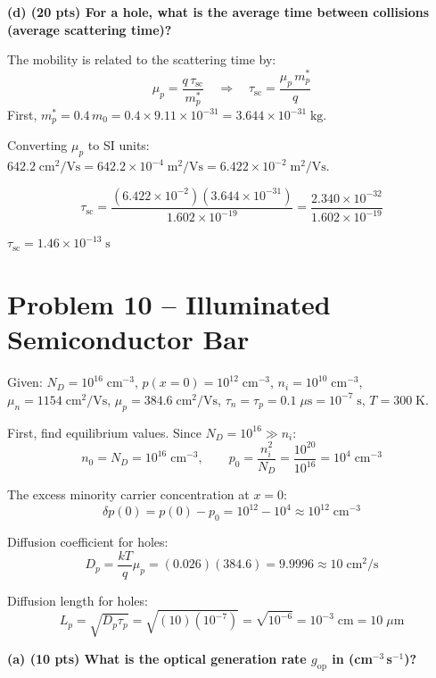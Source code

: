 \documentclass[11pt]{article}
\begin{document}
\textbf{(d) (20 pts) For a hole, what is the average time between collisions (average scattering time)?}

The mobility is related to the scattering time by:
\[
  \mu_p = \frac{q\,\tau_{\text{sc}}}{m_p^*} \quad \Longrightarrow \quad
  \tau_{\text{sc}} = \frac{\mu_p \, m_p^*}{q}
\]
First, $m_p^* = 0.4\,m_0 = 0.4 \times 9.11 \times 10^{-31} = 3.644 \times 10^{-31}\;\text{kg}$.

Converting $\mu_p$ to SI units: $642.2\;\text{cm}^2/\text{Vs} = 642.2 \times 10^{-4}\;\text{m}^2/\text{Vs} = 6.422 \times 10^{-2}\;\text{m}^2/\text{Vs}$.

\[
  \tau_{\text{sc}} = \frac{(6.422 \times 10^{-2})(3.644 \times 10^{-31})}{1.602 \times 10^{-19}}
  = \frac{2.340 \times 10^{-32}}{1.602 \times 10^{-19}}
\]

\begin{answerbox}
  $\tau_{\text{sc}} = 1.46 \times 10^{-13}\;\text{s}$
\end{answerbox}

\newpage

\section*{Problem 10 -- Illuminated Semiconductor Bar}

Given: $N_D = 10^{16}\;\text{cm}^{-3}$, $p(x=0) = 10^{12}\;\text{cm}^{-3}$, $n_i = 10^{10}\;\text{cm}^{-3}$, $\mu_n = 1154\;\text{cm}^2/\text{Vs}$, $\mu_p = 384.6\;\text{cm}^2/\text{Vs}$, $\tau_n = \tau_p = 0.1\;\mu\text{s} = 10^{-7}\;\text{s}$, $T = 300\;\text{K}$.

First, find equilibrium values. Since $N_D = 10^{16} \gg n_i$:
\[
  n_0 = N_D = 10^{16}\;\text{cm}^{-3}, \qquad p_0 = \frac{n_i^2}{N_D} = \frac{10^{20}}{10^{16}} = 10^4\;\text{cm}^{-3}
\]

The excess minority carrier concentration at $x = 0$:
\[
  \delta p(0) = p(0) - p_0 = 10^{12} - 10^4 \approx 10^{12}\;\text{cm}^{-3}
\]

Diffusion coefficient for holes:
\[
  D_p = \frac{kT}{q}\mu_p = (0.026)(384.6) = 9.9996 \approx 10\;\text{cm}^2/\text{s}
\]

Diffusion length for holes:
\[
  L_p = \sqrt{D_p \tau_p} = \sqrt{(10)(10^{-7})} = \sqrt{10^{-6}} = 10^{-3}\;\text{cm} = 10\;\mu\text{m}
\]

\textbf{(a) (10 pts) What is the optical generation rate $g_{\text{op}}$ in (cm$^{-3}$\,s$^{-1}$)?}
\end{document}
